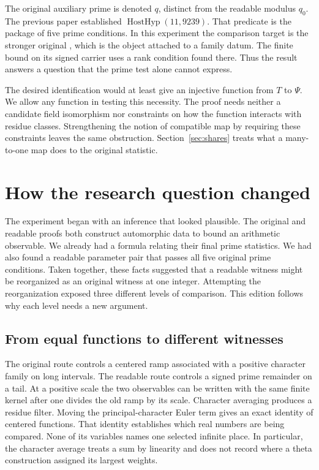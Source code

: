 \documentclass[12pt,letterpaper]{article}
\newcommand{\id}[1]{\ifmmode\text{\small\nolinkurl{#1}}\else{\small\nolinkurl{#1}}\fi}
\begin{document}
The original auxiliary prime is denoted $q$, distinct from the readable modulus $q_0$. The previous paper established $\operatorname{HostHyp}(11,9239)$. That predicate is the package of five prime conditions. In this experiment the comparison target is the stronger original \id{Host}, which is the object attached to a family datum. The finite bound on its signed carrier uses a rank condition found there. Thus the result answers a question that the prime test alone cannot express.

The desired identification would at least give an injective function from $T$ to $\Psi$. We allow any function in testing this necessity. The proof needs neither a candidate field isomorphism nor constraints on how the function interacts with residue classes. Strengthening the notion of compatible map by requiring these constraints leaves the same obstruction. Section~\ref{sec:shares} treats what a many-to-one map does to the original statistic.


\section{How the research question changed}\label{sec:route}
The experiment began with an inference that looked plausible. The original and readable proofs both construct automorphic data to bound an arithmetic observable. We already had a formula relating their final prime statistics. We had also found a readable parameter pair that passes all five original prime conditions. Taken together, these facts suggested that a readable witness might be reorganized as an original witness at one integer. Attempting the reorganization exposed three different levels of comparison. This edition follows why each level needs a new argument.

\subsection{From equal functions to different witnesses}
The original route controls a centered ramp associated with a positive character family on long intervals. The readable route controls a signed prime remainder on a tail. At a positive scale the two observables can be written with the same finite kernel after one divides the old ramp by its scale. Character averaging produces a residue filter. Moving the principal-character Euler term gives an exact identity of centered functions. That identity establishes which real numbers are being compared. None of its variables names one selected infinite place. In particular, the character average treats a sum by linearity and does not record where a theta construction assigned its largest weights.
\end{document}
